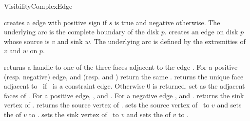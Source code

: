 \begin{ccRefConcept}{VisibilityComplexEdge}
\ccCreation
{}

{ creates a edge with positive sign if $s$ is true and negative otherwise.
The underlying arc is the complete boundary of the disk $p$. }
{ creates an edge on disk $p$ whose source is $v$ and sink $w$. The underlying
arc is defined by the extremities of $v$ and $w$ on $p$. }

\ccOperations

\ccTagFullDeclarations
{}
\ccGlue
{}
\ccGlue
{}
\ccGlue
{}
    { returns a handle to one of the three faces adjacent to the edge \ccVar. For
      a positive (resp. negative) edge,  and  (resp.
       and ) return the same .}
    {returns the unique face adjacent to \ccVar\ if \ccVar\ is a constraint edge.
     Otherwise $0$ is returned.}
    {set  as the adjacent faces of \ccVar. For a positive edge, 
     ,  and . For a negative
     edge ,  and .}
    {returns the sink vertex of \ccVar.}
\ccGlue
{}
    {returns the source vertex of \ccVar.}
\ccGlue
{}
    {sets the source vertex of \ccVar\  to $v$ and sets the 
    of $v$ to \ccVar.}
\ccGlue
{}
    {sets the sink vertex of \ccVar\  to $v$ and sets the 
    of $v$ to \ccVar.}

\ccHasModels



\end{ccRefConcept}

